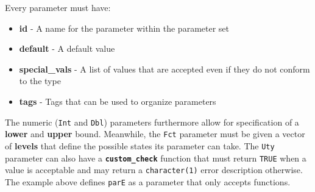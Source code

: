 \documentclass[
]{scrbook}
\newenvironment{Shaded}{\begin{snugshade}}{\end{snugshade}}
\newcommand{\AttributeTok}[1]{\textcolor[rgb]{0.77,0.63,0.00}{#1}}
\newcommand{\ConstantTok}[1]{\textcolor[rgb]{0.00,0.00,0.00}{#1}}
\newcommand{\ControlFlowTok}[1]{\textcolor[rgb]{0.13,0.29,0.53}{\textbf{#1}}}
\newcommand{\DecValTok}[1]{\textcolor[rgb]{0.00,0.00,0.81}{#1}}
\newcommand{\FunctionTok}[1]{\textcolor[rgb]{0.00,0.00,0.00}{#1}}
\newcommand{\NormalTok}[1]{#1}
\newcommand{\OtherTok}[1]{\textcolor[rgb]{0.56,0.35,0.01}{#1}}
\newcommand{\SpecialCharTok}[1]{\textcolor[rgb]{0.00,0.00,0.00}{#1}}
\newcommand{\StringTok}[1]{\textcolor[rgb]{0.31,0.60,0.02}{#1}}
\providecommand{\tightlist}{%
  \setlength{\itemsep}{0pt}\setlength{\parskip}{0pt}}
\renewenvironment{Shaded} {\begin{snugshade}\small} {\end{snugshade}}
\begin{document}
\begin{Shaded}
\end{Shaded}

Every parameter must have:

\begin{itemize}
\tightlist
\item
  \textbf{id} - A name for the parameter within the parameter set
\item
  \textbf{default} - A default value
\item
  \textbf{special\_vals} - A list of values that are accepted even if they do not conform to the type
\item
  \textbf{tags} - Tags that can be used to organize parameters
\end{itemize}

The numeric (\texttt{Int} and \texttt{Dbl}) parameters furthermore allow for specification of a \textbf{lower} and \textbf{upper} bound.
Meanwhile, the \texttt{Fct} parameter must be given a vector of \textbf{levels} that define the possible states its parameter can take.
The \texttt{Uty} parameter can also have a \textbf{\texttt{custom\_check}} function that must return \texttt{TRUE} when a value is acceptable and may return a \texttt{character(1)} error description otherwise.
The example above defines \texttt{parE} as a parameter that only accepts functions.
\end{document}
